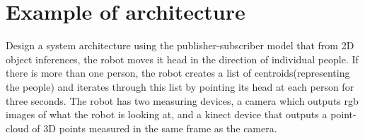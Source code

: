 \documentclass{article}
\begin{document}
\section{Example of architecture}
Design a system  architecture using the publisher-subscriber model that from 2D object inferences, the robot moves it head in 
the direction of individual people. If there is more than one person, the robot creates a list of 
centroids(representing the people) and iterates through this list by pointing its head at each person for three seconds. 
The robot has two measuring devices, a camera which outputs rgb images of what the robot is looking at, 
and a kinect device that outputs a point-cloud of 3D points measured in the same frame as the camera.\\\\\\
\label{fig:my_label}
\end{document}
